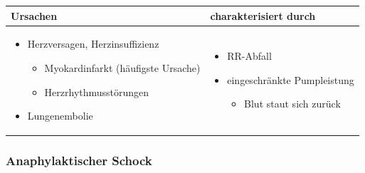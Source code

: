 \begin{center}
\begin{tabularx}{\linewidth}[H]{XX}
\toprule
Ursachen &
charakterisiert durch\\\midrule
\begin{itemize}
  \item Herzversagen, Herzinsuffizienz
  \begin{itemize}
    \item Myokardinfarkt (häufigste Ursache)
    \item Herzrhythmusstörungen
  \end{itemize}
  \item Lungenembolie
\end{itemize}
 &
 \begin{itemize}
   \item RR-Abfall
   \item eingeschränkte Pumpleistung
   \begin{itemize}
     \item Blut staut sich zurück
   \end{itemize}
 \end{itemize}
\\\bottomrule
\end{tabularx}
\end{center}








\subsubsection{Anaphylaktischer Schock}
\label{topic:schock-anaphylaktischer}

